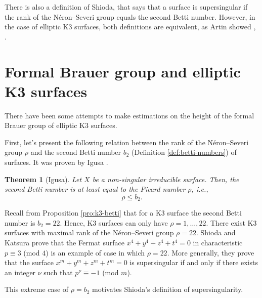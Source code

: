 \documentclass{report}
\newtheorem{theorem}[equation]{Theorem}
\theoremstyle{definition}
\begin{document}
There is also a definition of Shioda, that says that a surface is supersingular if the rank of the N\'{e}ron--Severi group equals the second Betti number. However, in the case of elliptic K3 surfaces, both definitions are equivalent, as Artin showed \cite[Theorem~0.1]{artin1974supersingular}, \cite[Theorem~1.7]{artin1974supersingular}.

\section{Formal Brauer group and elliptic K3 surfaces}

There have been some attempts to make estimations on the height of the formal Brauer group of elliptic K3 surfaces. 

First, let's present the following relation between the rank of the N\'{e}ron--Severi group $\rho$ and the second Betti number $b_2$ (Definition \ref{def:betti-numbers}) of surfaces. It was proven by Igusa \cite{igusa1960betti}.

\begin{theorem}[Igusa]
Let $X$ be a non-singular irreducible surface. Then, the second Betti number is at least equal to the Picard number $\rho$, i.e.,
\begin{equation}
\label{eq:igusa-inequality}
\rho\leq b_2.
\end{equation}
\end{theorem}

Recall from Proposition \ref{pro:k3-betti} that for a K3 surface the second Betti number is $b_2=22$. Hence, K3 surfaces can only have $\rho=1,\ldots,22$. There exist K3 surfaces with maximal rank of the N\'{e}ron--Severi group $\rho=22$. Shioda and Katsura \cite[Theorem~4.3]{shioda1979fermat} prove that the Fermat surface $x^4+y^4+z^4+t^4=0$ in characteristic $p\equiv3$ (mod $4$) is an example of case in which $\rho=22$. More generally, they prove that the surface $x^m+y^m+z^m+t^m=0$ is supersingular if and only if there exists an integer $\nu$ such that $p^{\nu}\equiv-1$ (mod $m$).

This extreme case of $\rho=b_2$ motivates Shioda's definition of supersingularity.
\end{document}
